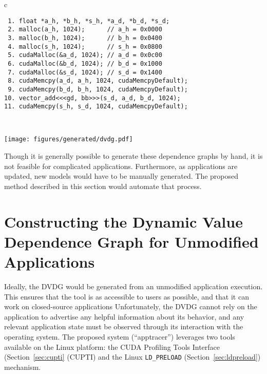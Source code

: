 \begin{table}[ht]
	\centering
    \caption[Dynamic Value Dependence Graph]{
        Example of the dynamic value dependence graph for a simple vector add.
        Allocations in the code are commented with a hypothetical position of the allocation.
        Square blocks represent values, and rounded boxes represent node labels.
    }
    \label{tab:dvdg}
    \begin{tabular}{c}
        \begin{minipage}{\textwidth}
            \begin{lstlisting}
 1. float *a_h, *b_h, *s_h, *a_d, *b_d, *s_d;
 2. malloc(a_h, 1024);      // a_h = 0x0000
 3. malloc(b_h, 1024);      // b_h = 0x0400
 4. malloc(s_h, 1024);      // s_h = 0x0800
 5. cudaMalloc(&a_d, 1024); // a_d = 0x0c00  
 6. cudaMalloc(&b_d, 1024); // b_d = 0x1000
 7. cudaMalloc(&s_d, 1024); // s_d = 0x1400
 8. cudaMemcpy(a_d, a_h, 1024, cudaMemcpyDefault);
 9. cudaMemcpy(b_d, b_h, 1024, cudaMemcpyDefault);
10. vector_add<<<gd, bb>>>(s_d, a_d, b_d, 1024);
11. cudaMemcpy(s_h, s_d, 1024, cudaMemcpyDefault);
            \end{lstlisting}
        \end{minipage}        
    \\
        \begin{minipage}{\textwidth}
            \centering
            \texttt{[image: figures/generated/dvdg.pdf]}

        \end{minipage}

	\end{tabular}
\end{table}

Though it is generally possible to generate these dependence graphs by hand, it is not feasible for complicated applications.
Furthermore, as applications are updated, new models would have to be manually generated.
The proposed method described in this section would automate that process.

\section{Constructing the Dynamic Value Dependence Graph for Unmodified Applications}

Ideally, the DVDG would be generated from an unmodified application execution.
This ensures that the tool is as accessible to users as possible, and that it can work on closed-source applications
Unfortunately, the DVDG cannot rely on the application to advertise any helpful information about its behavior, and any relevant application state must be observed through its interaction with the operating system.
The proposed system (``apptracer'') leverages two tools available on the Linux platform: the CUDA Profiling Tools Interface (Section~\ref{sec:cupti} (CUPTI) and the Linux \texttt{LD\_PRELOAD} (Section~\ref{sec:ldpreload}) mechanism.

